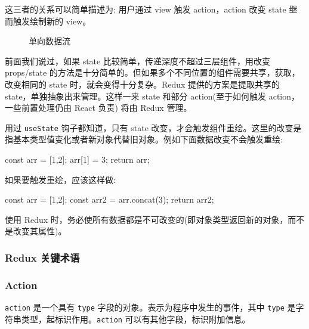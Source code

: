 这三者的关系可以简单描述为: 用户通过 view 触发 action，action 改变 state 继而触发绘制新的 view。

\begin{figure}[H]
  \small
  \centering
  \caption{单向数据流}
  \label{fig:单向数据流}
\end{figure}

前面我们说过，如果 state 比较简单，传递深度不超过三层组件，用改变 props/state 的方法是十分简单的。但如果多个不同位置的组件需要共享，获取，改变相同的 state 时，就会变得十分复杂。Redux 提供的方案是提取共享的 state，单独抽象出来管理。这样一来 state 和部分 action(至于如何触发 action，一些前置处理仍由 React 负责) 将由 Redux 管理。

用过 \texttt{useState} 钩子都知道，只有 state 改变，才会触发组件重绘。这里的改变是指基本类型值变化或者新对象代替旧对象。例如下面数据改变不会触发重绘:

\begin{JavaScript}
const arr = [1,2];
arr[1] = 3;
return arr;
\end{JavaScript}

如果要触发重绘，应该这样做:

\begin{JavaScript}
const arr = [1,2];
const arr2 = arr.concat(3);
return arr2;
\end{JavaScript}

使用 Redux 时，务必使所有数据都是不可改变的(即对象类型返回新的对象，而不是改变其属性)。

\subsubsection{Redux 关键术语}

\subsubsection*{Action}

\texttt{action} 是一个具有 \texttt{type} 字段的对象。表示为程序中发生的事件，其中 \texttt{type} 是字符串类型，起标识作用。\texttt{action} 可以有其他字段，标识附加信息。

